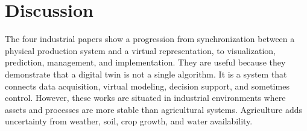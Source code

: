 \section{Discussion}

The four industrial papers show a progression from synchronization between a physical production system and a virtual representation, to visualization, prediction, management, and implementation. They are useful because they demonstrate that a digital twin is not a single algorithm. It is a system that connects data acquisition, virtual modeling, decision support, and sometimes control. However, these works are situated in industrial environments where assets and processes are more stable than agricultural systems. Agriculture adds uncertainty from weather, soil, crop growth, and water availability.

